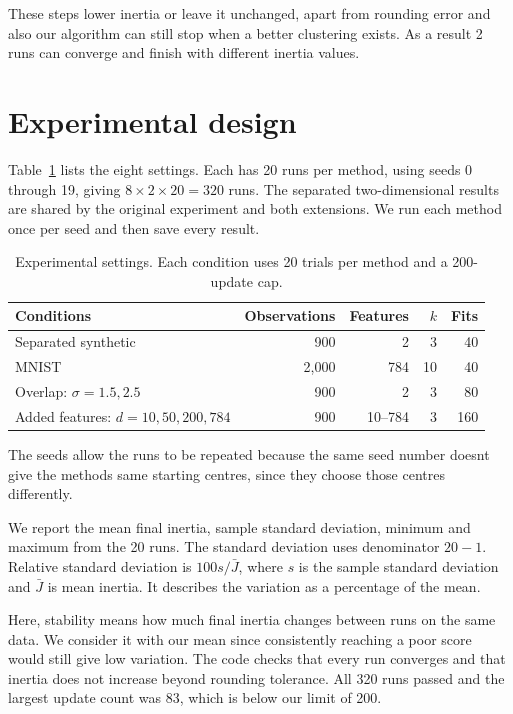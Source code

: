 \documentclass[11pt,a4paper]{article}
\begin{document}
These steps lower inertia or leave it unchanged, apart from rounding error and also our algorithm can still stop when a better clustering exists. As a result 2 runs can converge and finish with different inertia values.

\section{Experimental design}

Table~\ref{tab:design} lists the eight settings. Each has 20 runs per method, using seeds 0 through 19, giving $8\times2\times20=320$ runs. The separated two-dimensional results are shared by the original experiment and both extensions. We run each method once per seed and then save every result.

\begin{table}[htbp]
\centering
\caption{Experimental settings. Each condition uses 20 trials per method and a 200-update cap.}
\label{tab:design}
\small
\begin{tabular}{@{}lrrrr@{}}
\toprule
Conditions & Observations & Features & $k$ & Fits\\
\midrule
Separated synthetic & 900 & 2 & 3 & 40\\
MNIST & 2,000 & 784 & 10 & 40\\
Overlap: $\sigma=1.5,2.5$ & 900 & 2 & 3 & 80\\
Added features: $d=10,50,200,784$ & 900 & 10--784 & 3 & 160\\
\bottomrule
\end{tabular}
\end{table}

The seeds allow the runs to be repeated because the same seed number doesnt give the methods same starting centres, since they choose those centres differently.

We report the mean final inertia, sample standard deviation, minimum and maximum from the 20 runs. The standard deviation uses denominator $20-1$. Relative standard deviation is $100s/\bar{J}$, where $s$ is the sample standard deviation and $\bar{J}$ is mean inertia. It describes the variation as a percentage of the mean.

Here, stability means how much final inertia changes between runs on the same data. We consider it with our mean since consistently reaching a poor score would still give low variation. The code checks that every run converges and that inertia does not increase beyond rounding tolerance. All 320 runs passed and the largest update count was 83, which is below our limit of 200.
\end{document}
